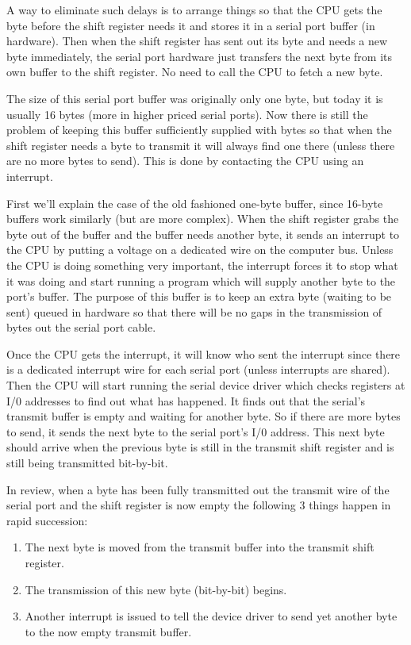 \documentclass[11pt, twosides, titlepage]{article}
\begin{document}
        A way to eliminate such delays is to arrange things so that the CPU gets the byte before the shift register needs it and stores it in a serial port buffer (in hardware). Then when the shift register has sent out its byte and needs a new byte immediately, the serial port hardware just transfers the next byte from its own buffer to the shift register. No need to call the CPU to fetch a new byte.
        
        The size of this serial port buffer was originally only one byte, but today it is usually 16 bytes (more in higher priced serial ports). Now there is still the problem of keeping this buffer sufficiently supplied with bytes so that when the shift register needs a byte to transmit it will always find one there (unless there are no more bytes to send). This is done by contacting the CPU using an interrupt.
        
        First we'll explain the case of the old fashioned one-byte buffer, since 16-byte buffers work similarly (but are more complex). When the shift register grabs the byte out of the buffer and the buffer needs another byte, it sends an interrupt to the CPU by putting a voltage on a dedicated wire on the computer bus. Unless the CPU is doing something very important, the interrupt forces it to stop what it was doing and start running a program which will supply another byte to the port's buffer. The purpose of this buffer is to keep an extra byte (waiting to be sent) queued in hardware so that there will be no gaps in the transmission of bytes out the serial port cable.
        
        Once the CPU gets the interrupt, it will know who sent the interrupt since there is a dedicated interrupt wire for each serial port (unless interrupts are shared). Then the CPU will start running the serial device driver which checks registers at I/0 addresses to find out what has happened. It finds out that the serial's transmit buffer is empty and waiting for another byte. So if there are more bytes to send, it sends the next byte to the serial port's I/0 address. This next byte should arrive when the previous byte is still in the transmit shift register and is still being transmitted bit-by-bit.
        
        In review, when a byte has been fully transmitted out the transmit wire of the serial port and the shift register is now empty the following 3 things happen in rapid succession:
        
        \begin{enumerate}
            \item The next byte is moved from the transmit buffer into the transmit shift register.
            \item The transmission of this new byte (bit-by-bit) begins.
            \item Another interrupt is issued to tell the device driver to send yet another byte to the now empty transmit buffer.
        \end{enumerate}
            
\end{document}

